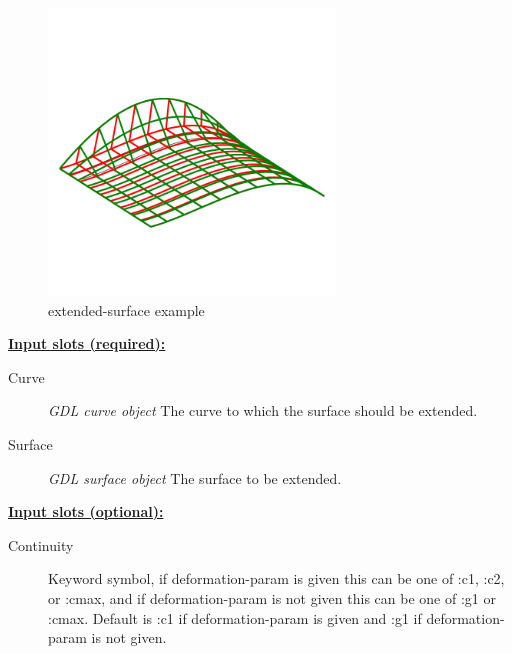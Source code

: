 \documentclass [11pt]{book}
\begin{document}
\begin{itemize}
\begin{figure}
\begin{center}
\includegraphics[width=3in,height=3in]{../images/example-extended-surface.pdf}
\end{center}

\caption{extended-surface example}

\label{fig:extended-surface}

\end{figure}





\textbf{
\underline{Input slots (required):}}

\begin{description}

\item [Curve]
\emph{GDL curve object} The curve to which the surface should be extended.


\item [Surface]
\emph{GDL surface object} The surface to be extended.


\end{description}






\textbf{
\underline{Input slots (optional):}}

\begin{description}

\item [Continuity]
Keyword symbol, if deformation-param is given this can
be one of :c1, :c2, or :cmax, and if deformation-param is not
given this can be one of :g1 or :cmax. Default is :c1 if
deformation-param is given and  :g1 if deformation-param is
not given.



\end{description}
\end{itemize}
\end{document}
